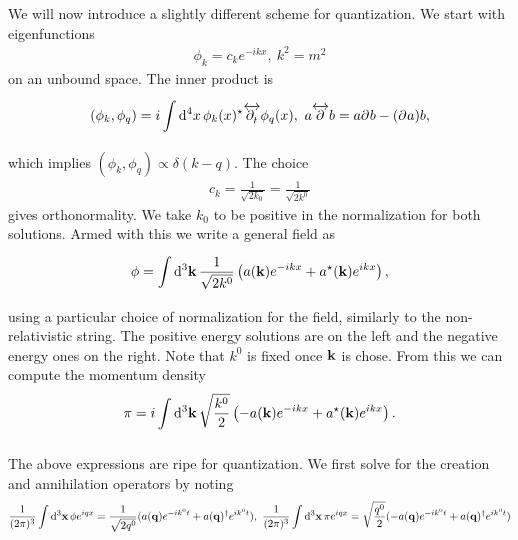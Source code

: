 We will now introduce a slightly different scheme for quantization. We start with eigenfunctions
\begin{align*}
	\phi_{k} = c_{k}e^{-ikx},\ k^{2} = m^{2}
\end{align*}
on an unbound space. The inner product is
\begin{align*}
	(\phi_{k}, \phi_{q}) = i\int\limits_{}^{}\dd[4]{x}\phi_{k}(x)^{\star}\overleftrightarrow{\partial^{}_{t}}\phi_{q}(x),\ a\overleftrightarrow{\partial^{}_{}}b = a\partial^{}_{}b - (\partial^{}_{}a)b,
\end{align*}
which implies $(\phi_{k}, \phi_{q})\propto \delta(k - q)$. The choice
\begin{align*}
	c_{k} = \frac{1}{\sqrt{2k_{0}}} = \frac{1}{\sqrt{2k^{0}}}
\end{align*}
gives orthonormality. We take $k_{0}$ to be positive in the normalization for both solutions. Armed with this we write a general field as
\begin{align*}
	\phi = \integ[3]{}{}{\vb{k}}{\frac{1}{\sqrt{2k^{0}}}\left(a(\vb{k})e^{-ikx} + a\cc(\vb{k})e^{ikx}\right)},%
\end{align*}
using a particular choice of normalization for the field, similarly to the non-relativistic string. The positive energy solutions are on the left and the negative energy ones on the right. Note that $k^{0}$ is fixed once $\vb{k}$ is chose. From this we can compute the momentum density
\begin{align*}
	\pi = i\int\limits_{}^{}\dd[3]{\vb{k}}\sqrt{\frac{k^{0}}{2}}\left(-a(\vb{k})e^{-ikx} + a^{\star}(\vb{k})e^{ikx}\right).
\end{align*}

The above expressions are ripe for quantization. We first solve for the creation and annihilation operators by noting
\begin{align*}
	\frac{1}{(2\pi)^{3}}\int\limits_{}^{}\dd[3]{\vb{x}}\phi e^{iqx} = \frac{1}{\sqrt{2q^{0}}}(a(\vb{q})e^{-ik^{0}t} + a(\vb{q})^{\dagger} e^{ik^{0}t}),\ \frac{1}{(2\pi)^{3}}\int\limits_{}^{}\dd[3]{\vb{x}}\pi e^{iqx} = \sqrt{\frac{q^{0}}{2}}(-a(\vb{q})e^{-ik^{0}t} + a(\vb{q})^{\dagger} e^{ik^{0}t})
\end{align*}

